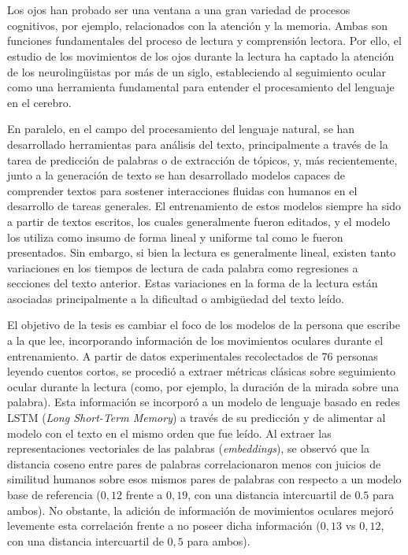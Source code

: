 \chapter*{\runtitulo}

\noindent Los ojos han probado ser una ventana a una gran variedad de procesos cognitivos, por ejemplo, relacionados con la atención y la memoria. Ambas son funciones fundamentales del proceso de lectura y comprensión lectora. Por ello, el estudio de los movimientos de los ojos durante la lectura ha captado la atención de los neurolingüistas por más de un siglo, estableciendo al seguimiento ocular como una herramienta fundamental para entender el procesamiento del lenguaje en el cerebro.

En paralelo, en el campo del procesamiento del lenguaje natural, se han desarrollado herramientas para análisis del texto, principalmente a través de la tarea de predicción de palabras o de extracción de tópicos, y, más recientemente, junto a la generación de texto se han desarrollado modelos capaces de comprender textos para sostener interacciones fluidas con humanos en el desarrollo de tareas generales. El entrenamiento de estos modelos siempre ha sido a partir de textos escritos, los cuales generalmente fueron editados, y el modelo los utiliza como insumo de forma lineal y uniforme tal como le fueron presentados. Sin embargo, si bien la lectura es generalmente lineal, existen tanto variaciones en los tiempos de lectura de cada palabra como regresiones a secciones del texto anterior. Estas variaciones en la forma de la lectura están asociadas principalmente a la dificultad o ambigüedad del texto leído.

El objetivo de la tesis es cambiar el foco de los modelos de la persona que escribe a la que lee, incorporando información de los movimientos oculares durante el entrenamiento. A partir de datos experimentales recolectados de $76$ personas leyendo cuentos cortos, se procedió a extraer métricas clásicas sobre seguimiento ocular durante la lectura (como, por ejemplo, la duración de la mirada sobre una palabra). Esta información se incorporó a un modelo de lenguaje basado en redes LSTM (\textit{Long Short-Term Memory}) a través de su predicción y de alimentar al modelo con el texto en el mismo orden que fue leído. Al extraer las representaciones vectoriales de las palabras (\textit{embeddings}), se observó que la distancia coseno entre pares de palabras correlacionaron menos con juicios de similitud humanos sobre esos mismos pares de palabras con respecto a un modelo base de referencia ($0,12$ frente a $0,19$, con una distancia intercuartil de $0.5$ para ambos). No obstante, la adición de información de movimientos oculares mejoró levemente esta correlación frente a no poseer dicha información ($0,13$ vs $0,12$, con una distancia intercuartil de $0,5$ para ambos).

